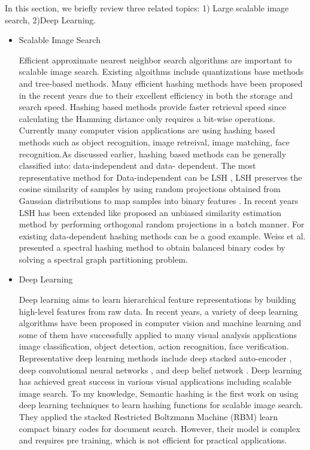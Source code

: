 \documentclass[12pt, a4paper,twoside]{article}
\begin{document}
\label{sec:Background}
In this section, we briefly review three related topics: 1) Large scalable image search, 2)Deep Learning.
\begin{itemize}
	\item Scalable Image Search

	Efficient approximate nearest neighbor search algorithms are important to scalable image search. Existing algoithms include quantizations
	base methods and tree-based methods. Many efficient hashing methods have been proposed in the recent years due to their excellent 
	efficiency in both the storage and search speed. Hashing based methods provide faster retrieval speed since calculating the Hamming distance 
	only requires a bit-wise operations. Currently many computer vision applications are using hashing based methods such as object recognition,
	image retreival, image matching, face recognition.As discussed earlier, hashing based methods can be generally classified into: data-independent and data-
	dependent. The most representative method for Data-independent can be LSH , LSH preserves the cosine similarity of samples by using random projections obtained from Gaussian distributions	to map samples into binary features \cite{LSH}. In recent years LSH has been extended like  \cite{unbiased} proposed an unbiased
	similarity estimation method by performing orthogonal random projections in a batch manner. For existing data-dependent hashing methods can be a good example. Weiss et al. \cite{81} presented a spectral hashing method to obtain balanced binary codes by solving a spectral graph partitioning problem.  

\end{itemize}
\begin{itemize}
	\item Deep Learning

	Deep learning aims to learn hierarchical feature representations by building high-level features from raw 
	data. In recent years, a variety of deep learning algorithms have been proposed in computer vision and machine
	learning and some of them have successfully applied to many visual analysis
	applications image classification, object detection, action recognition, face verification. Representative deep 
	learning methods include deep stacked auto-encoder \cite{34}, deep convolutional neural networks \cite{28}, and deep belief network \cite{17}.
	Deep learning has achieved great success in various visual applications including scalable image search. To my knowledge,
	Semantic hashing \cite{56} is the first work on using deep learning techniques to learn hashing functions for scalable
	image search. They applied the stacked Restricted Boltzmann Machine (RBM) learn compact binary codes for document
	search. However, their model is complex and requires pre training, which is not efficient for practical applications.

\end{itemize}
\end{document}
